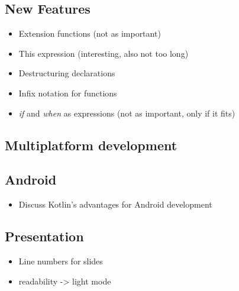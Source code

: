 \documentclass[a4paper,11pt]{article}
\begin{document}
  \subsection{New Features}
    \begin{itemize}
      \item Extension functions (not as important)
      \item This expression (interesting, also not too long)
      \item Destructuring declarations
      \item Infix notation for functions
      \item \textit{if} and \textit{when} as expressions (not as important, only if it fits)
    \end{itemize}

  \subsection{Multiplatform development}
  
  \subsection{Android}
    \begin{itemize}
      \item Discuss Kotlin's advantages for Android development
    \end{itemize}

  \subsection{Presentation}
  \begin{itemize}
    \item Line numbers for slides
    \item readability -> light mode
  \end{itemize}
\end{document}
